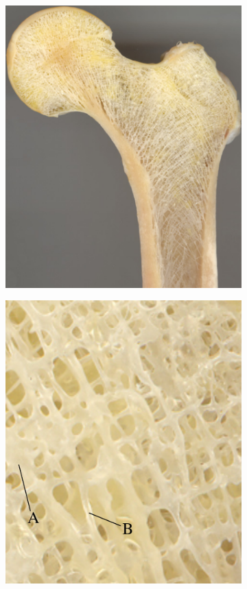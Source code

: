 \begin{figure}
\begin{subfigure}{0.49\linewidth}
	\centering
	\includegraphics[width=\linewidth]{./intro/Figures/Ascenzi_proximal}
\end{subfigure}
\begin{subfigure}{.49\linewidth}
	\centering
	\includegraphics[width=\linewidth]{./intro/Figures/Ascenzi_trabec}

\end{subfigure}
\end{figure}
